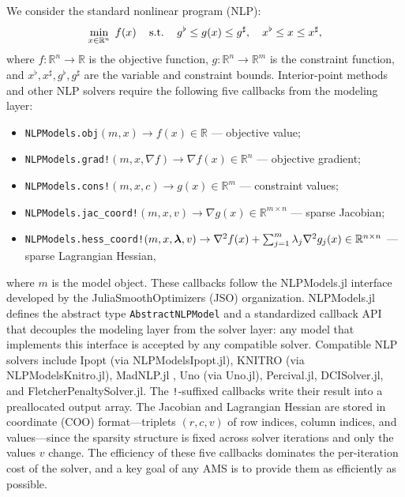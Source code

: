 \documentclass[11pt]{article}
\begin{document}
We consider the standard nonlinear program (NLP):
\begin{equation}\label{eq:nlp}
  \min_{x \in \mathbb{R}^n}\; f(x) \quad
  \mathop{\text{\normalfont s.t.}}\quad g^\flat \leq g(x) \leq g^\sharp,\quad x^\flat \leq x \leq x^\sharp,
\end{equation}
where $f:\mathbb{R}^n \to \mathbb{R}$ is the objective function, $g:\mathbb{R}^n \to \mathbb{R}^m$ is the constraint function, and $x^\flat, x^\sharp, g^\flat, g^\sharp$ are the variable and constraint bounds. Interior-point methods \citep{wachterImplementationInteriorpointFilter2006,nocedalNumericalOptimization2006} and other NLP solvers require the following five callbacks from the modeling layer:
\begin{itemize}
  \item \texttt{NLPModels.obj}$(m, x) \to f(x) \in \mathbb{R}$ --- objective value;
  \item \texttt{NLPModels.grad!}$(m, x, \nabla\!f) \to \nabla f(x) \in \mathbb{R}^n$ --- objective gradient;
  \item \texttt{NLPModels.cons!}$(m, x, c) \to g(x) \in \mathbb{R}^m$ --- constraint values;
  \item \texttt{NLPModels.jac\_coord!}$(m, x, v) \to \nabla g(x) \in \mathbb{R}^{m \times n}$ --- sparse Jacobian;
  \item \texttt{NLPModels.hess\_coord!}$(m, x, \boldsymbol{\lambda}, v) \to \nabla^2 f(x) + \sum_{j=1}^m \lambda_j \nabla^2 g_j(x) \in \mathbb{R}^{n \times n}$ --- sparse Lagrangian Hessian,
\end{itemize}
where $m$ is the model object. These callbacks follow the NLPModels.jl interface \citep{jsoNLPModelsJl} developed by the JuliaSmoothOptimizers (JSO) organization. NLPModels.jl defines the abstract type \texttt{AbstractNLPModel} and a standardized callback API that decouples the modeling layer from the solver layer: any model that implements this interface is accepted by any compatible solver. Compatible NLP solvers include Ipopt \citep{wachterImplementationInteriorpointFilter2006} (via NLPModelsIpopt.jl), KNITRO \citep{byrdKnitroIntegratedPackage2006} (via NLPModelsKnitro.jl), MadNLP.jl \citep{shinMadNLPjl2025}, Uno (via Uno.jl), Percival.jl, DCISolver.jl, and FletcherPenaltySolver.jl. The \texttt{!}-suffixed callbacks write their result into a preallocated output array. The Jacobian and Lagrangian Hessian are stored in coordinate (COO) format---triplets $(r, c, v)$ of row indices, column indices, and values---since the sparsity structure is fixed across solver iterations and only the values $v$ change. The efficiency of these five callbacks dominates the per-iteration cost of the solver, and a key goal of any AMS is to provide them as efficiently as possible.
\end{document}
